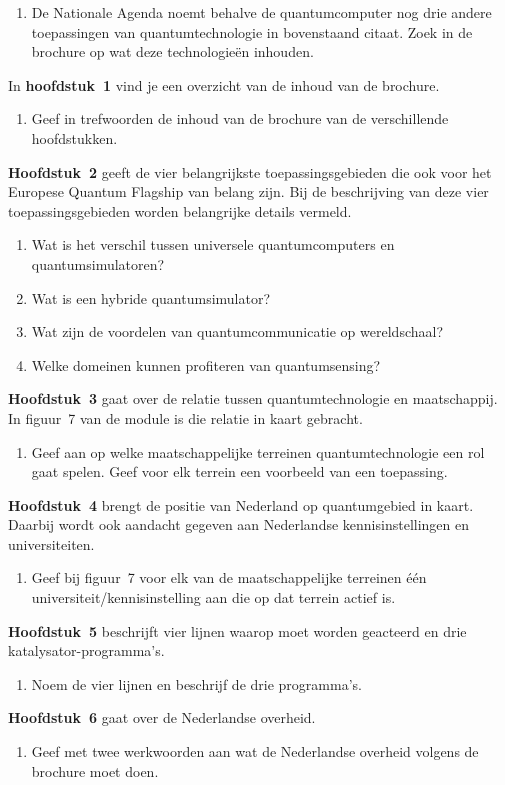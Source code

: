 \documentclass[../../main.tex]{subfiles}
\begin{document}
\begin{opdrachtlang}
\begin{enumerate}
\item De Nationale Agenda noemt behalve de quantumcomputer nog drie andere  toepassingen van quantumtechnologie in bovenstaand citaat. Zoek in de brochure op wat deze technologie\"en inhouden.
\end{enumerate}
In \textbf{hoofdstuk~1} vind je een overzicht van de inhoud van de brochure.
\begin{enumerate}[resume]
\item Geef in trefwoorden de inhoud van de  brochure van de verschillende hoofdstukken.
\end{enumerate}
\textbf{Hoofdstuk~2} geeft de vier belangrijkste toepassingsgebieden die ook voor het Europese Quantum Flagship  van belang zijn.  Bij de beschrijving van deze  vier toepassingsgebieden worden belangrijke details vermeld.
\begin{enumerate}[resume]
\item Wat is het verschil tussen universele quantumcomputers en quantumsimulatoren?
\item Wat is een hybride quantumsimulator?
\item Wat zijn de voordelen van quantumcommunicatie op wereldschaal?
\item Welke domeinen kunnen profiteren van quantumsensing?
\end{enumerate}
\textbf{Hoofdstuk~3} gaat over de relatie tussen quantumtechnologie en maatschappij. In figuur~7 van de module is die relatie in kaart gebracht. 
\begin{enumerate}[resume]
\item Geef aan op welke  maatschappelijke terreinen quantumtechnologie  een rol gaat spelen. Geef voor elk terrein een voorbeeld van een toepassing.
\end{enumerate}
\textbf{Hoofdstuk~4} brengt de positie van Nederland op quantumgebied in kaart. Daarbij wordt ook aandacht gegeven aan Nederlandse kennisinstellingen en universiteiten.
\begin{enumerate}[resume]
\item Geef bij figuur~7 voor elk van de maatschappelijke terreinen één universiteit/kennisinstelling aan die op dat terrein actief is. 
\end{enumerate}
\textbf{Hoofdstuk~5} beschrijft vier lijnen waarop moet worden geacteerd en drie katalysator-programma's.
\begin{enumerate}[resume]
\item Noem de vier lijnen en beschrijf de drie programma's.
\end{enumerate}
\textbf{Hoofdstuk~6} gaat over de Nederlandse overheid.
\begin{enumerate}[resume]
\item Geef met twee werkwoorden aan wat de Nederlandse overheid volgens de brochure moet doen.
\end{enumerate}
\end{opdrachtlang}
  
\end{document}
